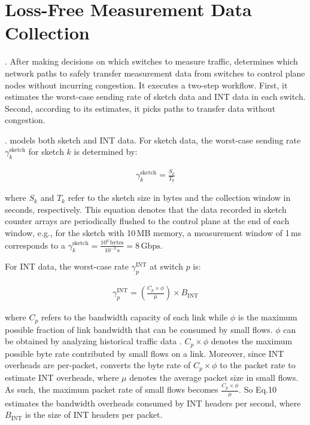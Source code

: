 \section{Loss-Free Measurement Data Collection}\label{collection}

. After making decisions on which switches to measure traffic, \sysname determines which network paths to safely transfer measurement data from switches to control plane nodes without incurring congestion. It executes a two-step workflow. First, it estimates the worst-case sending rate of sketch data and INT data in each switch. Second, according to its estimates, it picks paths to transfer data without congestion.

. \sysname models both sketch and INT data. For sketch data, the worst-case sending rate $\gamma_k^{\text{sketch}}$ for sketch $k$ is determined by:

\vspace{-4pt}
\begin{align}
\gamma_k^{\text{sketch}} = \frac{S_k}{T_k}
\end{align}

\noindent where $S_k$ and $T_k$ refer to the sketch size in bytes and the collection window in seconds, respectively. This equation denotes that the data recorded in sketch counter arrays are periodically flushed to the control plane at the end of each window, e.g., for the sketch with 10\,MB memory, a measurement window of 1\,ms corresponds to a $\gamma_k^{\text{sketch}}=\frac{10^{6}\,\text{bytes}}{10^{-3}\,\text{s}}=8\,\text{Gbps}$.  

For INT data, the worst-case rate $\gamma_p^{\text{INT}}$ at switch $p$ is:

\vspace{-4pt}
\begin{align}
\gamma_p^{\text{INT}} = \left( \frac{C_p \times \phi}{\mu} \right)\times B_{\text{INT}} 
\end{align}

\noindent where $C_p$ refers to the bandwidth capacity of each link while $\phi$ is the maximum possible fraction of link bandwidth that can be consumed by small flows. $\phi$ can be obtained by analyzing historical traffic data \cite{roy2015inside}. $C_p\times \phi$ denotes the maximum possible byte rate contributed by small flows on a link. Moreover, since INT overheads are per-packet, \sysname converts the byte rate of $C_p\times \phi$ to the packet rate to estimate INT overheads, where $\mu$ denotes the average packet size in small flows. As such, the maximum packet rate of small flows becomes $\frac{C_p \times \phi}{\mu}$. So Eq.10 estimates the bandwidth overheads consumed by INT headers per second, where $B_{\text{INT}}$ is the size of INT headers per packet. 

